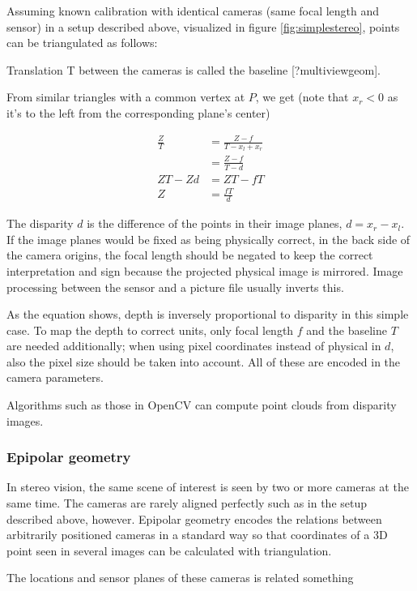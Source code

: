 Assuming known calibration with identical cameras (same focal length and sensor) in a setup described above, visualized in figure \ref{fig:simplestereo}, points can be triangulated as follows:

Translation T between the cameras is called the baseline [?multiviewgeom].

From similar triangles with a common vertex at $P$, we get (note that $x_r < 0$ as it's to the left from the corresponding plane's center)

\begin{align}
	\frac{Z}{T} &= \frac{Z-f}{T - x_l + x_r} \\
	&= \frac{Z-f}{T - d}\\
	ZT - Zd &= ZT - fT\\
	Z &= \frac{fT}{d}
\end{align}

The disparity $d$ is the difference of the points in their image planes, $d = x_r - x_l$.
If the image planes would be fixed as being physically correct, in the back side of the camera origins, the focal length should be negated to keep the correct interpretation and sign because the projected physical image is mirrored. Image processing between the sensor and a picture file usually inverts this.

As the equation shows, depth is inversely proportional to disparity in this simple case.
To map the depth to correct units, only focal length $f$ and the baseline $T$ are needed additionally; when using pixel coordinates instead of physical in $d$, also the pixel size should be taken into account.
All of these are encoded in the camera parameters.

Algorithms such as those in OpenCV can compute point clouds from disparity images.

\subsubsection{Epipolar geometry}

In stereo vision, the same scene of interest is seen by two or more cameras at the same time.
The cameras are rarely aligned perfectly such as in the setup described above, however.
Epipolar geometry encodes the relations between arbitrarily positioned cameras in a standard way so that coordinates of a 3D point seen in several images can be calculated with triangulation.

The locations and sensor planes of these cameras is related something

